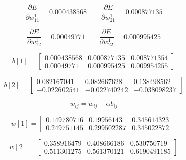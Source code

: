 \begin{equation*}
    \frac{\partial E}{\partial w_{11}^1} = 0.000438568
    \qquad 
    \frac{\partial E}{\partial w_{21}^1} = 0.000877135
\end{equation*}

\begin{equation*}
    \frac{\partial E}{\partial w_{12}^1} = 0.00049771
    \qquad 
    \frac{\partial E}{\partial w_{22}^1} = 0.000995425
\end{equation*}

\begin{equation*}
    b[1] = \begin{bmatrix}
               0.000438568 & 0.000877135 & 0.008771354 \\
               0.00049771 & 0.000995425 & 0.009954255
           \end{bmatrix}
\end{equation*}

\begin{equation*}
    b[2] = \begin{bmatrix}
               0.082167041 & 0.082667628 & 0.138498562 \\
               -0.022602541 & -0.022740242 & -0.038098237
           \end{bmatrix}
\end{equation*}

\begin{equation*}
    w_{ij} = w_{ij} - \alpha b_{ij}
\end{equation*}

\begin{equation*}
    w[1] = \begin{bmatrix}
               0.149780716 & 0.19956143 & 0.345614323 \\
               0.249751145 & 0.299502287 & 0.345022872
           \end{bmatrix}
\end{equation*}

\begin{equation*}
    w[2] = \begin{bmatrix}
               0.358916479 & 0.408666186 & 0.530750719 \\
               0.511301275 & 0.561370121 & 0.6190491185
           \end{bmatrix}
\end{equation*}
